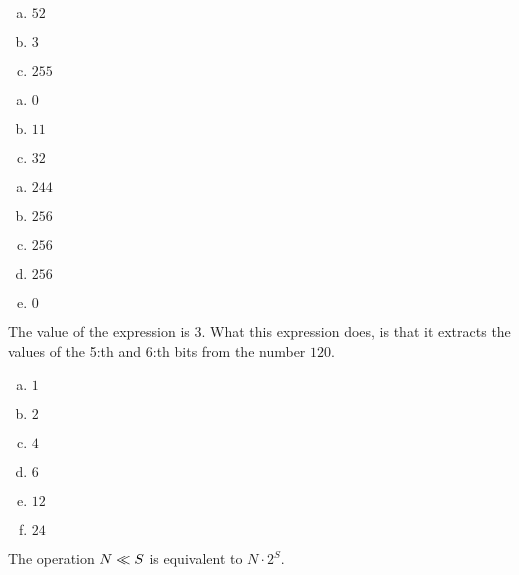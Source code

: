 \begin{Answer}[ref={bitor}]
  \begin{enumerate}[(a)]
  \item $52$
  \item $3$
  \item $255$
  \end{enumerate}
\end{Answer}

\begin{Answer}[ref={bitxor}]
  \begin{enumerate}[(a)]
  \item $0$
  \item $11$
  \item $32$
  \end{enumerate}
\end{Answer}

\begin{Answer}[ref={bitnot}]
  \begin{enumerate}[(a)]
  \item $244$
  \item $256$
  \item $256$
  \item $256$
  \item $0$
  \end{enumerate}
\end{Answer}

\begin{Answer}[ref={bit-shiting}]

  The value of the expression is $3$. What this expression does, is
  that it extracts the values of the 5:th and 6:th bits from the
  number $120$.

\end{Answer}

\begin{Answer}[ref={bit-equiv}]

  \begin{enumerate}[(a)]
  \item $1$
  \item $2$
  \item $4$
  \item $6$
  \item $12$
  \item $24$
  \end{enumerate}

  The operation $N \ll S$ is equivalent to $N \cdot 2^S$.

\end{Answer}

